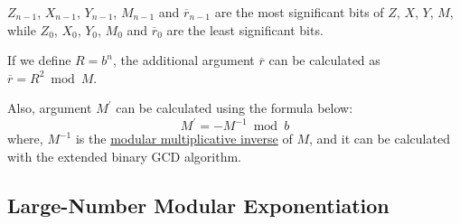 \documentclass[main\_\_EN.tex]{subfiles}
\begin{document}
\begin{math}Z_{n-1}\end{math},
\begin{math}X_{n-1}\end{math},
\begin{math}Y_{n-1}\end{math},
\begin{math}M_{n-1}\end{math} and
\begin{math}\overline{r}_{n-1}\end{math} are the most significant bits of
\begin{math}Z\end{math},
\begin{math}X\end{math},
\begin{math}Y\end{math},
\begin{math}M\end{math}, while
\begin{math}Z_{0}\end{math},
\begin{math}X_{0}\end{math},
\begin{math}Y_{0}\end{math},
\begin{math}M_{0}\end{math} and
\begin{math}\overline{r}_{0}\end{math} are the least significant bits.

If we define \begin{math}R = b^{n}\end{math}, the additional argument $\overline{r}$ can be calculated as \begin{math}\overline{r} = R^{2} \bmod M\end{math}.

Also, argument $M^{\prime}$ can be calculated using the formula below:
\[
 M^{\prime} = - M^{-1} \bmod b
\]
where, $M^{-1}$ is the \href{https://en.wikipedia.org/wiki/Modular\_multiplicative\_inverse}{modular multiplicative inverse} of $M$, and it can be calculated with the extended binary GCD algorithm.

\subsection{Large-Number Modular Exponentiation} \label{sec:rsa-large-modular-Exponentiation}
\end{document}
